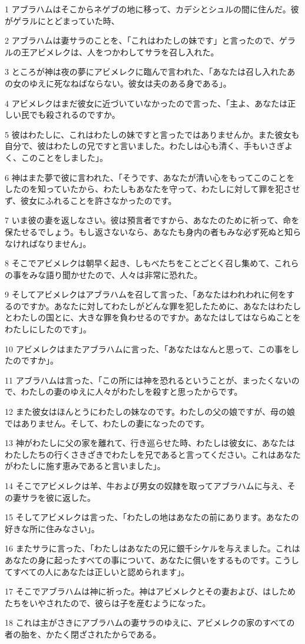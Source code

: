 \par 1 アブラハムはそこからネゲブの地に移って、カデシとシュルの間に住んだ。彼がゲラルにとどまっていた時、
\par 2 アブラハムは妻サラのことを、「これはわたしの妹です」と言ったので、ゲラルの王アビメレクは、人をつかわしてサラを召し入れた。
\par 3 ところが神は夜の夢にアビメレクに臨んで言われた、「あなたは召し入れたあの女のゆえに死なねばならない。彼女は夫のある身である」。
\par 4 アビメレクはまだ彼女に近づいていなかったので言った、「主よ、あなたは正しい民でも殺されるのですか。
\par 5 彼はわたしに、これはわたしの妹ですと言ったではありませんか。また彼女も自分で、彼はわたしの兄ですと言いました。わたしは心も清く、手もいさぎよく、このことをしました」。
\par 6 神はまた夢で彼に言われた、「そうです、あなたが清い心をもってこのことをしたのを知っていたから、わたしもあなたを守って、わたしに対して罪を犯させず、彼女にふれることを許さなかったのです。
\par 7 いま彼の妻を返しなさい。彼は預言者ですから、あなたのために祈って、命を保たせるでしょう。もし返さないなら、あなたも身内の者もみな必ず死ぬと知らなければなりません」。
\par 8 そこでアビメレクは朝早く起き、しもべたちをことごとく召し集めて、これらの事をみな語り聞かせたので、人々は非常に恐れた。
\par 9 そしてアビメレクはアブラハムを召して言った、「あなたはわれわれに何をするのですか。あなたに対してわたしがどんな罪を犯したために、あなたはわたしとわたしの国とに、大きな罪を負わせるのですか。あなたはしてはならぬことをわたしにしたのです」。
\par 10 アビメレクはまたアブラハムに言った、「あなたはなんと思って、この事をしたのですか」。
\par 11 アブラハムは言った、「この所には神を恐れるということが、まったくないので、わたしの妻のゆえに人々がわたしを殺すと思ったからです。
\par 12 また彼女はほんとうにわたしの妹なのです。わたしの父の娘ですが、母の娘ではありません。そして、わたしの妻になったのです。
\par 13 神がわたしに父の家を離れて、行き巡らせた時、わたしは彼女に、あなたはわたしたちの行くさきざきでわたしを兄であると言ってください。これはあなたがわたしに施す恵みであると言いました」。
\par 14 そこでアビメレクは羊、牛および男女の奴隷を取ってアブラハムに与え、その妻サラを彼に返した。
\par 15 そしてアビメレクは言った、「わたしの地はあなたの前にあります。あなたの好きな所に住みなさい」。
\par 16 またサラに言った、「わたしはあなたの兄に銀千シケルを与えました。これはあなたの身に起ったすべての事について、あなたに償いをするものです。こうしてすべての人にあなたは正しいと認められます」。
\par 17 そこでアブラハムは神に祈った。神はアビメレクとその妻および、はしためたちをいやされたので、彼らは子を産むようになった。
\par 18 これは主がさきにアブラハムの妻サラのゆえに、アビメレクの家のすべての者の胎を、かたく閉ざされたからである。

